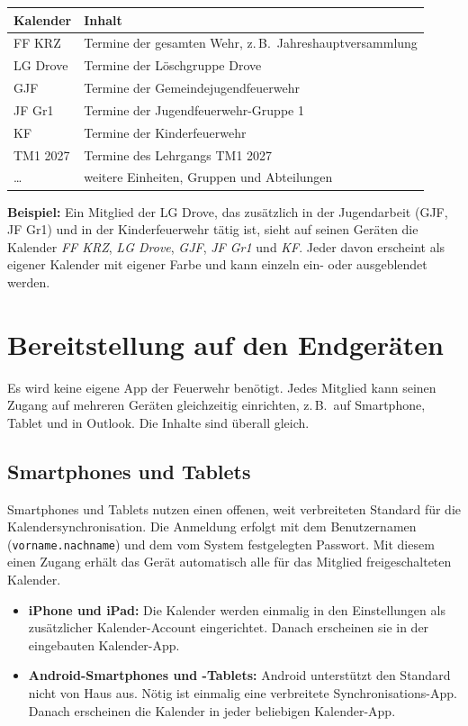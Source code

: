 \documentclass[a4paper,fontsize=10pt]{scrartcl}
\begin{document}
\begin{center}
\begin{tabularx}{0.85\textwidth}{lX}
\toprule
\textbf{Kalender} & \textbf{Inhalt} \\
\midrule
FF KRZ   & Termine der gesamten Wehr, z.\,B.\ Jahreshauptversammlung \\
LG Drove & Termine der Löschgruppe Drove \\
GJF      & Termine der Gemeindejugendfeuerwehr \\
JF Gr1   & Termine der Jugendfeuerwehr-Gruppe 1 \\
KF       & Termine der Kinderfeuerwehr \\
TM1 2027 & Termine des Lehrgangs TM1 2027 \\
\ldots   & weitere Einheiten, Gruppen und Abteilungen \\
\bottomrule
\end{tabularx}
\end{center}

\textbf{Beispiel:} Ein Mitglied der LG Drove, das zusätzlich in der
Jugendarbeit (GJF, JF Gr1) und in der Kinderfeuerwehr tätig ist, sieht auf
seinen Geräten die Kalender \emph{FF KRZ}, \emph{LG Drove}, \emph{GJF},
\emph{JF Gr1} und \emph{KF}. Jeder davon erscheint als eigener Kalender mit
eigener Farbe und kann einzeln ein- oder ausgeblendet werden.

\section{Bereitstellung auf den Endgeräten}

Es wird keine eigene App der Feuerwehr benötigt. Jedes Mitglied kann seinen
Zugang auf mehreren Geräten gleichzeitig einrichten, z.\,B.\ auf Smartphone,
Tablet und in Outlook. Die Inhalte sind überall gleich.

\subsection*{Smartphones und Tablets}

Smartphones und Tablets nutzen einen offenen, weit verbreiteten Standard für
die Kalendersynchronisation. Die Anmeldung erfolgt mit dem Benutzernamen
(\texttt{vorname.nachname}) und dem vom System festgelegten Passwort. Mit
diesem einen Zugang erhält das Gerät automatisch alle für das Mitglied
freigeschalteten Kalender.

\begin{itemize}
  \item \textbf{iPhone und iPad:} Die Kalender werden einmalig in den
        Einstellungen als zusätzlicher Kalender-Account eingerichtet. Danach
        erscheinen sie in der eingebauten Kalender-App.
  \item \textbf{Android-Smartphones und -Tablets:} Android unterstützt den
        Standard nicht von Haus aus. Nötig ist einmalig eine verbreitete
        Synchronisations-App. Danach erscheinen die Kalender in jeder
        beliebigen Kalender-App.
\end{itemize}
\end{document}
